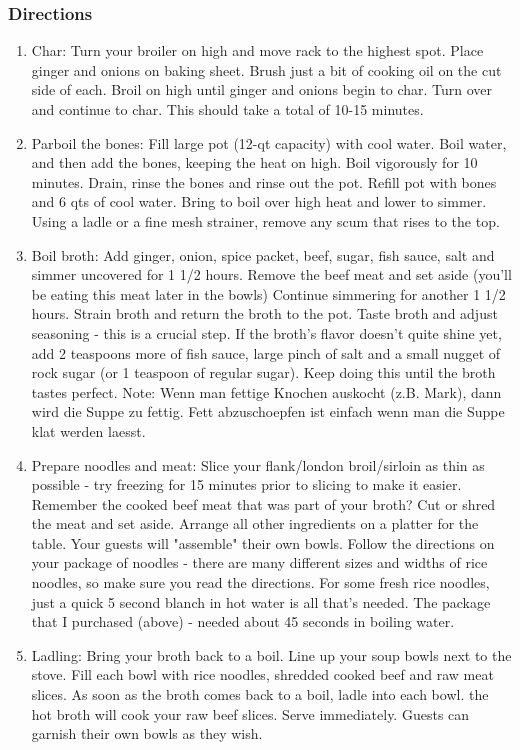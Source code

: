 \subsubsection*{Directions}
\begin{enumerate}
\item Char: Turn your broiler on high and move rack to the highest spot. Place ginger and onions on baking sheet. Brush just a bit of cooking oil on the cut side of each. Broil on high until ginger and onions begin to char. Turn over and continue to char. This should take a total of 10-15 minutes.

\item Parboil the bones: Fill large pot (12-qt capacity) with cool water. Boil water, and then add the bones, keeping the heat on high. Boil vigorously for 10 minutes. Drain, rinse the bones and rinse out the pot. Refill pot with bones and 6 qts of cool water. Bring to boil over high heat and lower to simmer. Using a ladle or a fine mesh strainer, remove any scum that rises to the top.

\item Boil broth: Add ginger, onion, spice packet, beef, sugar, fish sauce, salt and simmer uncovered for 1 1/2 hours. Remove the beef meat and set aside (you'll be eating this meat later in the bowls) Continue simmering for another 1 1/2 hours. Strain broth and return the broth to the pot. Taste broth and adjust seasoning - this is a crucial step. If the broth's flavor doesn't quite shine yet, add 2 teaspoons more of fish sauce, large pinch of salt and a small nugget of rock sugar (or 1 teaspoon of regular sugar). Keep doing this until the broth tastes perfect. Note: Wenn man fettige Knochen auskocht (z.B. Mark), dann wird die Suppe zu fettig. Fett abzuschoepfen ist einfach wenn man die Suppe klat werden laesst.

\item Prepare noodles and meat: Slice your flank/london broil/sirloin as thin as possible - try freezing for 15 minutes prior to slicing to make it easier. Remember the cooked beef meat that was part of your broth? Cut or shred the meat and set aside. Arrange all other ingredients on a platter for the table. Your guests will "assemble" their own bowls. Follow the directions on your package of noodles - there are many different sizes and widths of rice noodles, so make sure you read the directions. For some fresh rice noodles, just a quick 5 second blanch in hot water is all that's needed. The package that I purchased (above) - needed about 45 seconds in boiling water.

\item Ladling: Bring your broth back to a boil. Line up your soup bowls next to the stove. Fill each bowl with rice noodles, shredded cooked beef and raw meat slices. As soon as the broth comes back to a boil, ladle into each bowl. the hot broth will cook your raw beef slices. Serve immediately. Guests can garnish their own bowls as they wish.
\end{enumerate}
\pagebreak
